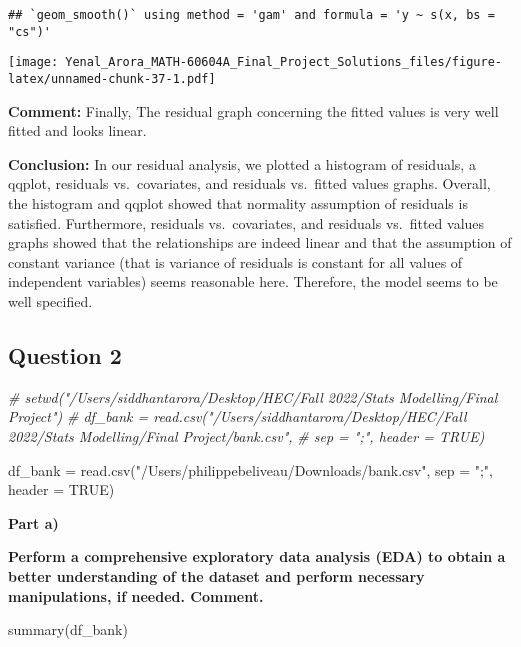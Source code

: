 \documentclass[
]{article}
\newenvironment{Shaded}{\begin{snugshade}}{\end{snugshade}}
\newcommand{\AttributeTok}[1]{\textcolor[rgb]{0.77,0.63,0.00}{#1}}
\newcommand{\CommentTok}[1]{\textcolor[rgb]{0.56,0.35,0.01}{\textit{#1}}}
\newcommand{\ConstantTok}[1]{\textcolor[rgb]{0.00,0.00,0.00}{#1}}
\newcommand{\FunctionTok}[1]{\textcolor[rgb]{0.00,0.00,0.00}{#1}}
\newcommand{\NormalTok}[1]{#1}
\newcommand{\OtherTok}[1]{\textcolor[rgb]{0.56,0.35,0.01}{#1}}
\newcommand{\StringTok}[1]{\textcolor[rgb]{0.31,0.60,0.02}{#1}}
\begin{document}
\begin{verbatim}
## `geom_smooth()` using method = 'gam' and formula = 'y ~ s(x, bs = "cs")'
\end{verbatim}

\texttt{[image: Yenal\_Arora\_MATH-60604A\_Final\_Project\_Solutions\_files/figure-latex/unnamed-chunk-37-1.pdf]}

\textbf{Comment:} Finally, The residual graph concerning the fitted
values is very well fitted and looks linear.

\textbf{Conclusion:} In our residual analysis, we plotted a histogram of
residuals, a qqplot, residuals vs.~covariates, and residuals vs.~fitted
values graphs. Overall, the histogram and qqplot showed that normality
assumption of residuals is satisfied. Furthermore, residuals
vs.~covariates, and residuals vs.~fitted values graphs showed that the
relationships are indeed linear and that the assumption of constant
variance (that is variance of residuals is constant for all values of
independent variables) seems reasonable here. Therefore, the model seems
to be well specified.

\hypertarget{question-2}{%
\subsection{Question 2}\label{question-2}}

\begin{Shaded}
\begin{Highlighting}[]
\CommentTok{\# setwd("/Users/siddhantarora/Desktop/HEC/Fall 2022/Stats Modelling/Final Project")}
\CommentTok{\# df\_bank = read.csv("/Users/siddhantarora/Desktop/HEC/Fall 2022/Stats Modelling/Final Project/bank.csv",}
\CommentTok{\#                   sep = ";", header = TRUE)}

\NormalTok{df\_bank }\OtherTok{=} \FunctionTok{read.csv}\NormalTok{(}\StringTok{"/Users/philippebeliveau/Downloads/bank.csv"}\NormalTok{,}
                   \AttributeTok{sep =} \StringTok{";"}\NormalTok{, }\AttributeTok{header =} \ConstantTok{TRUE}\NormalTok{)}
\end{Highlighting}
\end{Shaded}

\textbf{Part a)}

\textbf{Perform a comprehensive exploratory data analysis (EDA) to
obtain a better understanding of the dataset and perform necessary
manipulations, if needed. Comment.}

\begin{Shaded}
\begin{Highlighting}[]
\FunctionTok{summary}\NormalTok{(df\_bank)}
\end{Highlighting}
\end{Shaded}
\end{document}
